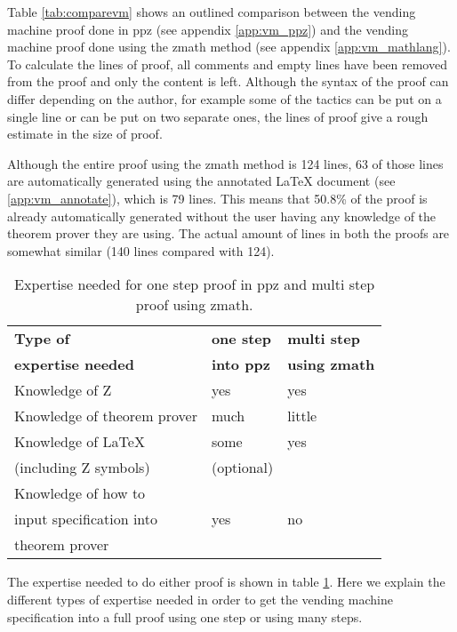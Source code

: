 Table \ref{tab:comparevm} shows an outlined comparison between the vending machine proof done in \gls{ppz} (see appendix \ref{app:vm_ppz}) and the vending machine proof done using the \gls{zmath} method (see appendix \ref{app:vm_mathlang}). To calculate the lines of proof, all comments and empty lines have been removed from the proof and only the content is left. Although the syntax of the proof can differ depending on the author, for example some of the tactics can be put on a single line or can be put on two separate ones, the lines of proof give a rough estimate in the size of  proof.

Although the entire proof using the \gls{zmath} method is 124 lines, 63 of those lines are automatically generated using the annotated \LaTeX{} document (see \ref{app:vm_annotate}), which is 79 lines. This means that 50.8\% of the proof is already automatically generated without the user having any knowledge of the theorem prover they are using. The actual amount of lines in both the proofs are somewhat similar (140 lines compared with 124).

\begin{table}[H]
\begin{center}
\begin{tabular}{| l | l | l |}
\hline
\textbf{Type of} & \textbf{one step} & \textbf{multi step} \\
\textbf{expertise needed} & \textbf{into \gls{ppz}} & \textbf{using \gls{zmath}} \\
\hline
\hline
Knowledge of Z &  yes & yes \\
\hline
Knowledge of theorem prover & much & little \\
\hline
Knowledge of \LaTeX & some & yes \\
(including Z symbols) & (optional) & \\
\hline
Knowledge of how to & & \\
input specification into & yes & no \\
theorem prover & & \\
\hline
\end{tabular}
\end{center}
\caption{Expertise needed for one step proof in \gls{ppz} and multi step proof using \gls{zmath}.}
\label{tab:expertise}
\end{table}

The expertise needed to do either proof is shown in table \ref{tab:expertise}. Here we explain the different types of expertise needed in order to get the vending machine specification into a full proof using one step or using many steps.

